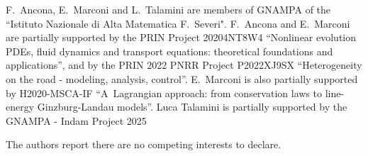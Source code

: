 \documentclass[11pt, twoside, reqno]{amsart}
\theoremstyle{definition}
\theoremstyle{remark}
\numberwithin{equation}{section}
\begin{document}
F.~Ancona, E.~Marconi and L.~Talamini are members of GNAMPA of the ``Istituto Nazionale di Alta Matematica
F.~Severi". F.~Ancona and E.~Marconi are partially supported by the PRIN
Project 20204NT8W4 “Nonlinear evolution PDEs, fluid dynamics and transport
equations: theoretical foundations and applications”,
and by the PRIN 2022 PNRR Project P2022XJ9SX ``Heterogeneity on the road - modeling, analysis, control''.
E.~Marconi  is also partially supported by H2020-MSCA-IF “A~Lagrangian approach: from conservation laws to line-energy Ginzburg-Landau models”. Luca Talamini is partially supported by the GNAMPA - Indam Project 2025 

\vspace{0.5cm}
The authors report there are no competing interests to declare.

\vspace{1cm}
\end{document}
